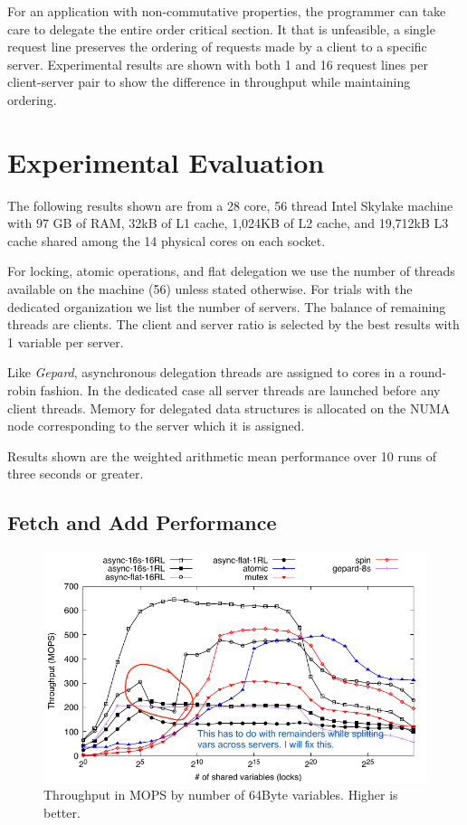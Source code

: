 \documentclass{uicthesi}
\begin{document}
For an application with non-commutative properties, the programmer can take care to delegate the entire order critical section. It that is unfeasible, a single request line preserves the ordering of requests made by a client to a specific server. Experimental results are shown with both 1 and 16 request lines per client-server pair to show the difference in throughput while maintaining ordering. 

\chapter{Experimental Evaluation}
The following results shown are from a 28 core, 56 thread Intel Skylake machine with 97 GB of RAM, 32kB of L1 cache, 1,024KB of L2 cache, and 19,712kB L3 cache shared among the 14 physical cores on each socket. 

For locking, atomic operations, and flat delegation we use the number of threads available on the machine (56) unless stated otherwise. For trials with the dedicated organization we list the number of servers. The balance of remaining threads are clients.  The client and server ratio is selected by the best results with 1 variable per server. 

Like \textit{Gepard}, asynchronous delegation threads are assigned to cores in a round-robin fashion. In the dedicated case all server threads are launched before any client threads. Memory for delegated data structures is allocated on the NUMA node corresponding to the server which it is assigned. 

Results shown are the weighted arithmetic mean performance over 10 runs of three seconds or greater. 

\section{Fetch and Add Performance}
\begin{figure}[ht!]
\centering
\includegraphics[width=0.9\columnwidth]{FIG/fetch_and_add_thput.pdf}
\caption{Throughput in MOPS by number of 64Byte variables. Higher is better. }
\label{fig:fetch_and_add_thput}
\end{figure}
\end{document}
